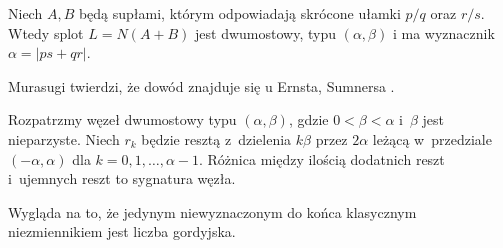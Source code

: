 \begin{proposition}
    Niech $A, B$ będą supłami, którym odpowiadają skrócone ułamki $p/q$ oraz $r/s$.
    Wtedy splot $L = N(A+B)$ jest dwumostowy, typu $(\alpha, \beta)$ i ma wyznacznik $\alpha = |ps + qr|$.
\end{proposition}

Murasugi \cite[twierdzenie 9.3.5]{murasugi96} twierdzi, że dowód znajduje się u Ernsta, Sumnersa \cite[lemat 2.1]{ernst90}.
%
%

\begin{proposition}
    Rozpatrzmy węzeł dwumostowy typu $(\alpha, \beta)$, gdzie $0 < \beta < \alpha$ i~$\beta$ jest nieparzyste.
    Niech $r_k$ będzie resztą z~dzielenia $k\beta$ przez $2\alpha$ leżącą w~przedziale $(-\alpha, \alpha)$ dla $k = 0, 1, \ldots, \alpha - 1$.
    Różnica między ilością dodatnich reszt i~ujemnych reszt to sygnatura węzła.
\end{proposition}

Wygląda na to, że jedynym niewyznaczonym do końca klasycznym niezmiennikiem jest liczba gordyjska.

%


